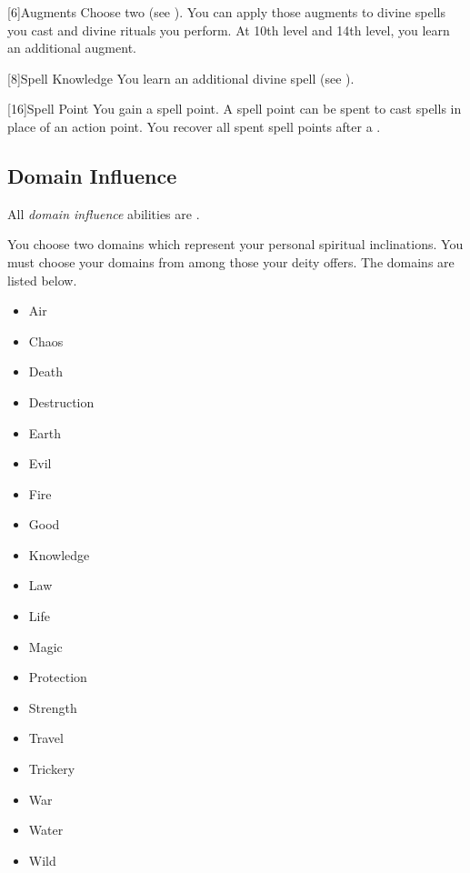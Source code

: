         [6]{Augments}
        Choose two  (see ).
        You can apply those augments to divine spells you cast and divine rituals you perform.
        At 10th level and 14th level, you learn an additional augment.

        [8]{Spell Knowledge}
        You learn an additional divine spell (see ).

        [16]{Spell Point} 
        You gain a spell point.
        A spell point can be spent to cast spells in place of an action point.
        You recover all spent spell points after a .

    \subsection{Domain Influence}
        All \textit{domain influence} abilities are .

        You choose two domains which represent your personal spiritual inclinations.
        You must choose your domains from among those your deity offers.
        The domains are listed below.

        \begin{itemize}
            \item{Air}
            \item{Chaos}
            \item{Death}
            \item{Destruction}
            \item{Earth}
            \item{Evil}
            \item{Fire}
            \item{Good}
            \item{Knowledge}
            \item{Law}
            \item{Life}
            \item{Magic}
            \item{Protection}
            \item{Strength}
            \item{Travel}
            \item{Trickery}
            \item{War}
            \item{Water}
            \item{Wild}
        \end{itemize}

